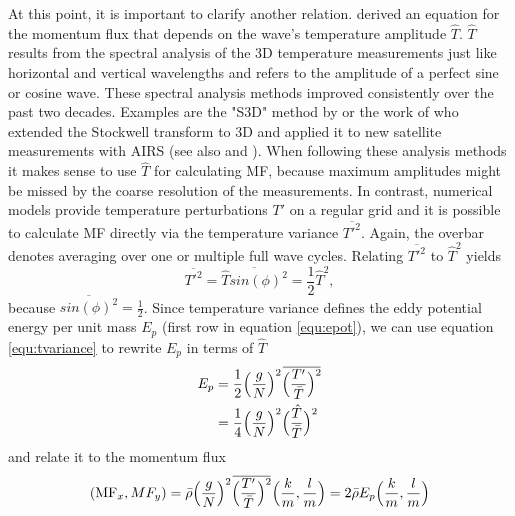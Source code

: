 At this point, it is important to clarify another relation. \textcite[]{ern_absolute_2004} derived an equation for the momentum flux that depends on the wave's temperature amplitude $\hat{T}$. $\hat{T}$ results from the spectral analysis of the 3D temperature measurements just like horizontal and vertical wavelengths and refers to the amplitude of a perfect sine or cosine wave. These spectral analysis methods improved consistently over the past two decades. Examples are the "S3D" method by \textcite[]{lehmann_consistency_2012} or the work of \textcite[]{wright_exploring_2017} who extended the Stockwell transform to 3D and applied it to new satellite measurements with AIRS (see also \cite[]{hindley_gravity_2019} and \cite[]{hindley_18year_2020}). When following these analysis methods it makes sense to use $\hat{T}$ for calculating MF, because maximum amplitudes might be missed by the coarse resolution of the measurements. In contrast, numerical models provide temperature perturbations $T'$ on a regular grid and it is possible to calculate MF directly via the temperature variance $\overbar{T'^2}$. Again, the overbar denotes averaging over one or multiple full wave cycles. Relating $\overbar{T'^2}$ to $\hat{T}^2$ yields
\begin{equation}
    \overbar{T'^2} = \overbar{\hat{T} sin(\phi)^2} = \frac{1}{2}\hat{T}^2,
    \label{equ:tvariance}
\end{equation}
because $\overbar{sin(\phi)^2} = \frac{1}{2}$. Since temperature variance defines the eddy potential energy per unit mass $E_p$ (first row in equation \ref{equ:epot}), we can use equation \ref{equ:tvariance} to rewrite $E_p$ in terms of $\hat{T}$
\begin{equation}
    \begin{split}
        E_p &= \frac{1}{2} \Bigl(\frac{g}{N}\Bigr)^2 \overbar{\Bigl(\frac{T'}{\bar{T}}\Bigr)^2} \\
            &= \frac{1}{4} \Bigl(\frac{g}{N}\Bigr)^2 \Bigl(\frac{\hat{T}}{\bar{T}}\Bigr)^2
    \end{split}
    \label{equ:epot}
\end{equation}
and relate it to the momentum flux
\begin{equation}
    (\mathrm{MF}_x, MF_y) = \bar{\rho} \Bigl(\frac{g}{N}\Bigr)^2 \overbar{\Bigl(\frac{T'}{\bar{T}}\Bigr)^2} \Bigl(\frac{k}{m},\frac{l}{m}\Bigr) = 2 \bar{\rho} E_p \Bigl(\frac{k}{m},\frac{l}{m}\Bigr)
    \label{equ:mf-epot}
\end{equation}
